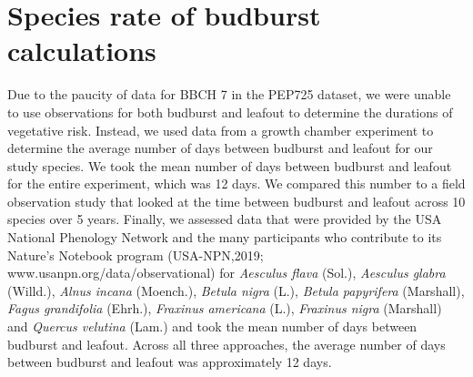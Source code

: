 \documentclass{article}\usepackage[]{graphicx}\usepackage[]{color}
\begin{document}
{\section*{Species rate of budburst calculations}
Due to the paucity of data for BBCH 7 in the PEP725 dataset, we were unable to use observations for both budburst and leafout to determine the durations of vegetative risk. Instead, we used data from a growth chamber experiment \citep{Flynn2018} to determine the average number of days between budburst and leafout for our study species. %
We took the mean number of days between budburst and leafout for the entire experiment, which was 12 days. We compared this number to a field observation study \citep{Donnelly2017} that looked at the time between budburst and leafout across 10 species over 5 years. Finally, we assessed data that were provided by the USA National Phenology Network and the many participants who contribute to its Nature's Notebook program (USA-NPN,2019; www.usanpn.org/data/observational) for \textit{Aesculus flava} (Sol.), \textit{Aesculus glabra} (Willd.), \textit{Alnus incana} (Moench.), \textit{Betula nigra} (L.), \textit{Betula papyrifera} (Marshall), \textit{Fagus grandifolia} (Ehrh.), \textit{Fraxinus americana} (L.), \textit{Fraxinus nigra} (Marshall) and \textit{Quercus velutina} (Lam.) and took the mean number of days between budburst and leafout. Across all three approaches, the average number of days between budburst and leafout was approximately 12 days.  

}
\end{document}
